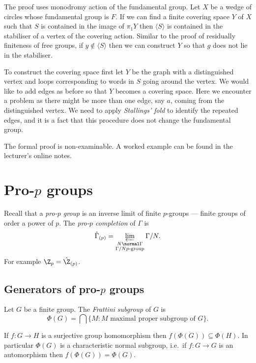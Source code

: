\documentclass[a4paper]{article}
\begin{document}
The proof uses monodromy action of the fundamental group. Let \(X\) be a wedge of circles whose fundamental group is \(F\). If we can find a finite covering space \(Y\) of \(X\) such that \(S\) is contained in the image of \(\pi_1Y\) then \(\langle S\rangle\) is contained in the stabiliser of a vertex of the covering action. Similar to the proof of residually finiteness of free groups, if \(y \notin \langle S\rangle\) then we can construct \(Y\) so that \(g\) does not lie in the stabiliser.

To construct the covering space first let \(Y\) be the graph with a distinguished vertex and loops corresponding to words in \(S\) going around the vertex. We would like to add edges as before so that \(Y\) becomes a covering space. Here we encounter a problem as there might be more than one edge, say \(a\), coming from the distinguished vertex. We need to apply \emph{Stallings' fold} to identify the repeated edges, and it is a fact that this procedure does not change the fundamental group.

The formal proof is non-examinable. A worked example can be found in the lecturer's online notes.

\section{Pro-\(p\) groups}

Recall that a \emph{pro-\(p\) group} is an inverse limit of finite \(p\)-groups --- finite groups of order a power of \(p\). The \emph{pro-\(p\) completion} of \(\Gamma\) is
\[
  \hat \Gamma_{(p)} = \varprojlim_{\substack{N \normal \Gamma \\ \Gamma/N p\text{-group}}} \Gamma/N.
\]
For example \(\Z_p = \hat \Z_{(p)}\).

\subsection{Generators of pro-\(p\) groups}

\begin{definition}
  Let \(G\) be a finite group. The \emph{Frattini subgroup} of \(G\) is
  \[
    \Phi(G) = \bigcap \{M: M \text{ maximal proper subgroup of } G\}.
  \]
\end{definition}

\begin{proposition}
  If \(f: G \to H\) is a surjective group homomorphism then \(f(\Phi(G)) \subseteq \Phi(H)\). In particular \(\Phi(G)\) is a characteristic normal subgroup, i.e.\ if \(f: G \to G\) is an automorphism then \(f(\Phi(G)) = \Phi(G)\).
\end{proposition}
\end{document}
